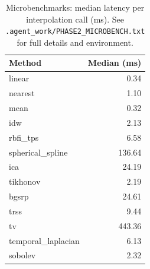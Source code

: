 \begin{table}[ht]
\centering
\small
\caption{Microbenchmarks: median latency per interpolation call (ms). See \texttt{.agent\_work/PHASE2\_MICROBENCH.txt} for full details and environment.}
\label{tab:phase2_microbench}
\begin{tabular}{l r}
\hline
Method & Median (ms) \\\hline
linear & 0.34 \\
nearest & 1.10 \\
mean & 0.32 \\
idw & 2.13 \\
rbfi\_tps & 6.58 \\
spherical\_spline & 136.64 \\
ica & 24.19 \\
tikhonov & 2.19 \\
bgsrp & 24.61 \\
trss & 9.44 \\
tv & 443.36 \\
temporal\_laplacian & 6.13 \\
sobolev & 2.32 \\
\end{tabular}
\end{table}
